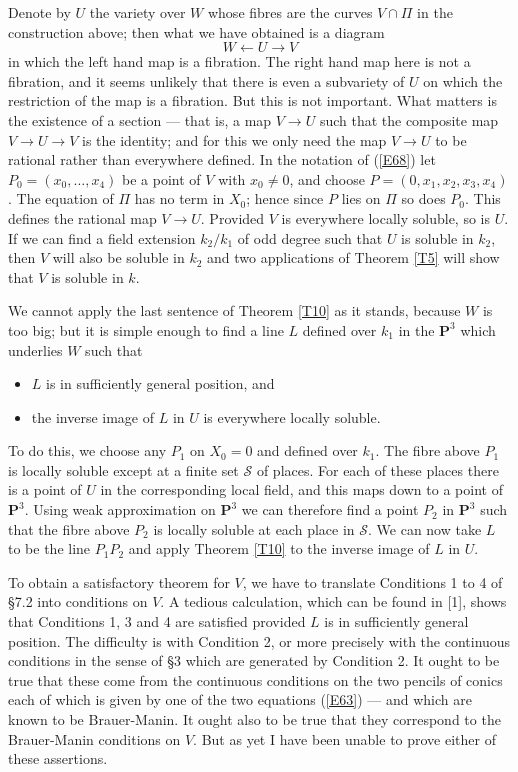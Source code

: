\documentclass[12pt]{article}
\def\bP{{\mathbf P}}
\def\sS{{\mathcal S}}
\begin{document}
Denote by $U$ the variety over $W$ whose fibres are the curves
$V\cap\Pi$ in the construction above; then what we have
obtained is a diagram
\[ W \longleftarrow U \longrightarrow V \]
in which the left hand map is a fibration. The right hand map
here is not a fibration, and it seems unlikely that there is
even a subvariety of $U$ on which the restriction of the map
is a fibration. But this is not important. What matters is
the existence of a section --- that is, a map $V\rightarrow
U$ such that the composite map $V\rightarrow U\rightarrow V$
is the identity; and for this we only need the map
$V\rightarrow U$ to be rational rather than everywhere
defined. In the notation of (\ref{E68}) let $P_0=(x_0,\ldots,
x_4)$ be a point of $V$ with $x_0\neq0$, and choose
$P=(0,x_1,x_2,x_3,x_4)$. The equation of $\Pi$ has no term in
$X_0$; hence since $P$ lies on $\Pi$ so does $P_0$. This
defines the rational map $V\rightarrow U$. Provided $V$ is
everywhere locally soluble, so is $U$. If we can find a field
extension $k_2/k_1$ of odd degree such that $U$ is soluble in
$k_2$, then $V$ will also be soluble in $k_2$ and two
applications of Theorem \ref{T5} will show that $V$ is
soluble in $k$.

We cannot apply the last sentence of Theorem \ref{T10} as it
stands, because $W$ is too big; but it is simple enough to
find a line $L$ defined over $k_1$ in the $\bP^3$ which
underlies $W$ such that
\begin{itemize}
\item $L$ is in sufficiently general position, and
\item the inverse image of $L$ in $U$ is everywhere locally
soluble.
\end{itemize}
To do this, we choose any $P_1$ on $X_0=0$ and defined over
$k_1$. The fibre above $P_1$ is locally soluble except at a
finite set $\sS$ of places. For each of these places there is
a point of $U$ in the corresponding local field, and this maps
down to a point of $\bP^3$. Using weak approximation on
$\bP^3$ we can therefore find a point $P_2$ in $\bP^3$ such
that the fibre above $P_2$ is locally soluble at each place in
$\sS$. We can now take $L$ to be the line $P_1P_2$ and apply
Theorem \ref{T10} to the inverse image of $L$ in $U$.

To obtain a satisfactory theorem for $V$, we have to translate
Conditions 1 to 4 of \S7.2 into conditions on $V$. A tedious
calculation, which can be found in [1], shows that
Conditions 1, 3 and 4 are satisfied provided $L$ is in
sufficiently general position. The difficulty is with
Condition 2, or more precisely with the continuous conditions
in the sense of \S3 which are generated by Condition 2. It
ought to be true that these come from the continuous
conditions on the two pencils of conics each of which is given
by one of the two equations (\ref{E63}) --- and which are
known to be Brauer-Manin. It ought also to be true that they
correspond to the Brauer-Manin conditions on $V$. But as yet
I have been unable to prove either of these assertions.
\end{document}
